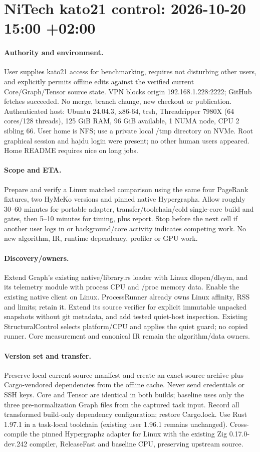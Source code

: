 \documentclass[11pt,a4paper]{article}
\begin{document}
\clearpage\section*{NiTech kato21 control: 2026-10-20 15:00 +02:00}
\paragraph{Authority and environment.} User supplies kato21 access for benchmarking,
requires not disturbing other users, and explicitly permits offline edits against the
verified current Core/Graph/Tensor source state. VPN blocks origin 192.168.1.228:2222;
GitHub fetches succeeded. No merge, branch change, new checkout or publication.
Authenticated host: Ubuntu 24.04.3, x86-64, tcsh, Threadripper 7980X (64 cores/128 threads),
125 GiB RAM, 96 GiB available, 1 NUMA node, CPU 2 sibling 66. User home is NFS;
use a private local /tmp directory on NVMe. Root graphical session and hajdu login
were present; no other human users appeared. Home README requires nice on long jobs.
\paragraph{Scope and ETA.} Prepare and verify a Linux matched comparison using the
same four PageRank fixtures, two HyMeKo versions and pinned native Hypergraphz.
Allow roughly 30--60 minutes for portable adapter, transfer/toolchain/cold single-core
build and gates, then 5--10 minutes for timing, plus report. Stop before the next cell
if another user logs in or background/core activity indicates competing work.
No new algorithm, IR, runtime dependency, profiler or GPU work.
\paragraph{Discovery/owners.} Extend Graph's existing native/library.rs loader with
Linux dlopen/dlsym, and its telemetry module with process CPU and /proc memory data.
Enable the existing native client on Linux. ProcessRunner already owns Linux affinity,
RSS and limits; retain it. Extend its source verifier for explicit immutable unpacked
snapshots without git metadata, and add tested quiet-host inspection. Existing
StructuralControl selects platform/CPU and applies the quiet guard; no copied runner.
Core measurement and canonical IR remain the algorithm/data owners.
\paragraph{Version set and transfer.} Preserve local current source manifest and create
an exact source archive plus Cargo-vendored dependencies from the offline cache. Never
send credentials or SSH keys. Core and Tensor are identical in both builds; baseline
uses only the three pre-normalization Graph files from the captured task input.
Record all transformed build-only dependency configuration; restore Cargo.lock.
Use Rust 1.97.1 in a task-local toolchain (existing user 1.96.1 remains unchanged).
Cross-compile the pinned Hypergraphz adapter for Linux with the existing Zig
0.17.0-dev.242 compiler, ReleaseFast and baseline CPU, preserving upstream source.
\end{document}
